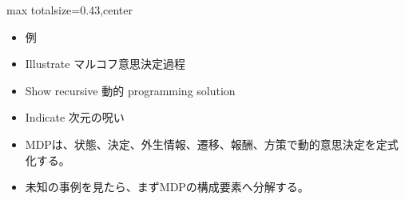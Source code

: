 \clearpage
{}
\begin{minipage}[t]{0.405\textwidth}
\begin{adjustbox}{max totalsize={\textwidth}{0.43\textheight},center}
\begin{minipage}{\textwidth}\scriptsize
{}\begin{itemize}
\item 例
\item Illustrate マルコフ意思決定過程
\item Show recursive 動的 programming solution
\item Indicate 次元の呪い
\end{itemize}\begin{itemize}
\item MDPは、状態、決定、外生情報、遷移、報酬、方策で動的意思決定を定式化する。
\item 未知の事例を見たら、まずMDPの構成要素へ分解する。
\end{itemize}
\end{minipage}
\end{adjustbox}
\end{minipage}\hfill
